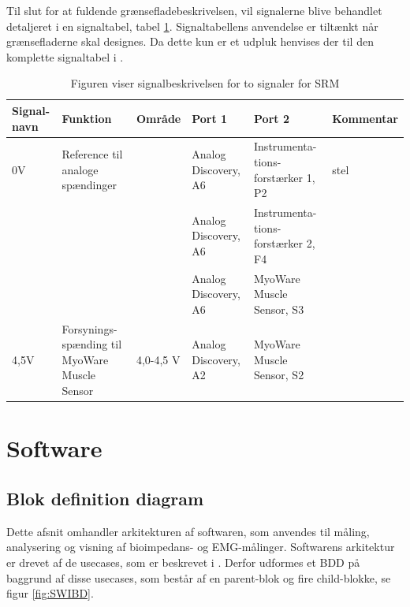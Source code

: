 Til slut for at fuldende grænsefladebeskrivelsen, vil signalerne blive behandlet detaljeret i en signaltabel, tabel \ref{tab:signaltabel}. Signaltabellens anvendelse er tiltænkt når grænsefladerne skal designes. Da dette kun er et udpluk henvises der til den komplette signaltabel i .



\begin{table}[H]
\centering
\begin{tabularx}{\textwidth}{l|X|X|X|X|X}
\hline

\textbf{Signal-navn}  & \textbf{Funktion}  & \textbf{Område} & \textbf{Port 1}      & \textbf{Port 2}  & \textbf{Kommentar} \\ \cline{4-6} \hline


0V & Reference til analoge spændinger  &   & Analog Discovery, A6  & Instrumenta-tions-forstærker 1, P2  &  stel   \\ \cline{4-6}

 &  &   &  Analog Discovery, A6 & Instrumenta-tions-forstærker 2, F4 & \\ \cline{4-6} 
 
 &  &   &  Analog Discovery, A6 & MyoWare Muscle Sensor, S3 & \\ \cline{4-6}

 \hline
4,5V & Forsynings- spænding til MyoWare Muscle Sensor  &  4,0-4,5 V & Analog Discovery, A2 & MyoWare Muscle Sensor, S2&     \\ \cline{4-6}	\hline

\end{tabularx}
\caption{Figuren viser signalbeskrivelsen for to signaler for SRM}
\label{tab:signaltabel}
\end{table}



\section{Software}
\subsection{Blok definition diagram}

Dette afsnit omhandler arkitekturen af softwaren, som anvendes til måling, analysering
og visning af bioimpedans- og EMG-målinger. Softwarens arkitektur er drevet af de usecases, som er beskrevet i . Derfor udformes et BDD på baggrund af disse usecases, som består af en parent-blok og fire child-blokke, se figur \ref{fig:SWIBD}. 

